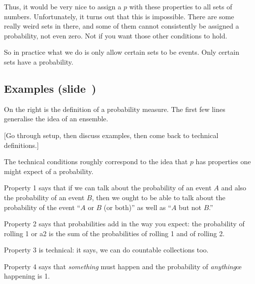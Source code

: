 \documentclass[11pt]{article}
\begin{document}
Thus, it would be very nice to assign a $p$ with these properties to all sets of
numbers. Unfortunately, it turns out that this is impossible. There are some
really weird sets in there, and some of them cannot consistently be assigned a
probability, not even zero. Not if you want those other conditions to hold.

So in practice what we do is only allow certain sets to be events. Only certain
sets have a probability. 

\newpage
\subsection*{Examples (slide~\pageref{slide:probability})}

On the right is the definition of a probability measure. The first few lines
generalise the idea of an ensemble.

[Go through setup, then discuss examples, then come back to technical
  definitions.]

The technical conditions roughly correspond to the idea
that $p$ has properties one might expect of a probability.

Property 1 says that if we can talk about the probability of an event $A$ and
also the probability of an event $B$, then we ought to be able to talk about the
probability of the event “$A$ or $B$ (or both)” as well as “$A$ but not $B$.”

Property 2 says that probabilities add in the way you expect: the probability of
rolling 1 or a2 is the sum of the probabilities of rolling 1 and of rolling 2.

Property 3 is technical: it says, we can do countable collections too.

Property 4 says that \emph{something} must happen and the probability of \emph{anything}œ
happening is 1.
\end{document}
